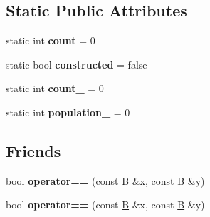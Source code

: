 \subsection*{Static Public Attributes}
\begin{DoxyCompactItemize}
\item 
\mbox{\label{struct_b_a286010989e4da14a31706af4b433755b}} 
static int {\bfseries count} = 0
\item 
\mbox{\label{struct_b_a33b0ae5a9ac6af9c50a587c16e9d30bb}} 
static bool {\bfseries constructed} = false
\item 
\mbox{\label{struct_b_a8388f105b5af1014ac4ed4e916c3b276}} 
static int {\bfseries count\+\_\+} = 0
\item 
\mbox{\label{struct_b_a822c0a2c90ed07e4bfa3d4e860ef8568}} 
static int {\bfseries population\+\_\+} = 0
\end{DoxyCompactItemize}
\subsection*{Friends}
\begin{DoxyCompactItemize}
\item 
\mbox{\label{struct_b_aae4e8a4d9a41c2101764856a7ffcf226}} 
bool {\bfseries operator==} (const \mbox{\hyperlink{struct_b}{B}} \&x, const \mbox{\hyperlink{struct_b}{B}} \&y)
\item 
\mbox{\label{struct_b_aae4e8a4d9a41c2101764856a7ffcf226}} 
bool {\bfseries operator==} (const \mbox{\hyperlink{struct_b}{B}} \&x, const \mbox{\hyperlink{struct_b}{B}} \&y)
\end{DoxyCompactItemize}


